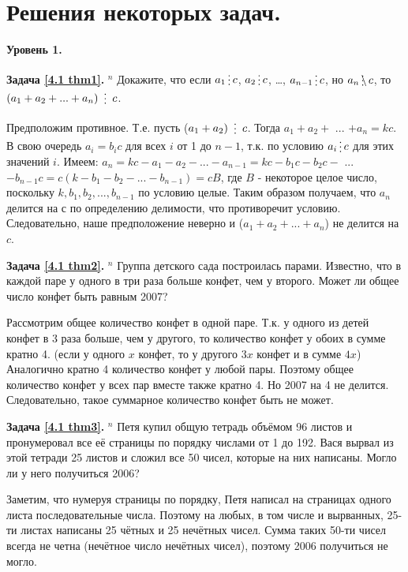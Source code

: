 \newpage

\section{Решения некоторых задач.}

\begin{center}
\textbf{Уровень 1.}
\end{center} 

\textbf{Задача \ref{4.1 thm1}.} $^n$
	Докажите, что если $a_1 \del c$, $a_2 \del c$, …, $a_{n-1} \del c$, но $a_n \ndel c$, то $(a_1 + a_2 + ... + a_n) \nskdel c$.
\begin{prf}
    Предположим противное. Т.е. пусть ($a_1+a_2) \skdel c$. Тогда $a_1 + a_2 +$ ... $+ a_n = kc$. В свою очередь $a_i = b_i c$ для всех $i$ от 1 до $n-1$, т.к. по условию $a_i \del c$ для этих значений $i$. Имеем: $a_n = kc - a_1 - a_2 -...- a_{n-1} = kc - b_1 c - b_2 c -$ ... $- b_{n-1}c = c(k - b_1 - b_2 -...- b_{n-1}) = cB$, где $B$ - некоторое целое число, поскольку $k, b_1, b_2,..., b_{n-1}$ по условию целые. 
    Таким образом получаем, что $a_n$ делится на $с$ по определению делимости, что противоречит условию. Следовательно, наше предположение неверно и ($a_1 + a_2 + ... + a_n$) не делится на $c$.
\end{prf}

\textbf{Задача \ref{4.1 thm2}.} $^n$
    Группа детского сада построилась парами. Известно, что в каждой паре у одного в три раза больше конфет, чем у второго. Может ли общее число конфет быть равным 2007?
\begin{prf}
    Рассмотрим общее количество конфет в одной паре. Т.к. у одного из детей конфет в 3 раза больше, чем у другого, то количество конфет у обоих в сумме кратно 4. (если у одного $x$ конфет, то у другого $3x$ конфет и в сумме $4x$) Аналогично кратно 4 количество конфет у любой пары. Поэтому общее количество конфет у всех пар вместе также кратно 4. Но 2007 на 4 не делится. Следовательно, такое суммарное количество конфет быть не может.
\end{prf}

\textbf{Задача \ref{4.1 thm3}.} $^n$
    Петя купил общую тетрадь объёмом 96 листов и пронумеровал все её страницы по порядку числами от 1 до 192. Вася вырвал из этой тетради 25 листов и сложил все 50 чисел, которые на них написаны. Могло ли у него получиться 2006?
\begin{prf}
    Заметим, что нумеруя страницы по порядку, Петя написал на страницах одного листа последовательные числа. Поэтому на любых, в том числе и вырванных, 25-ти листах написаны 25 чётных и 25 нечётных чисел. Сумма таких 50-ти чисел всегда не четна (нечётное число нечётных чисел), поэтому 2006 получиться не могло.
\end{prf}

